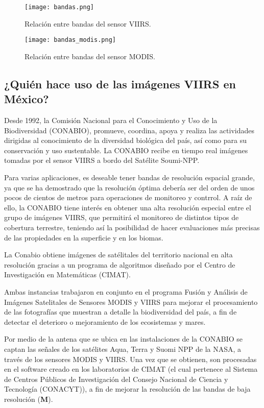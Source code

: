 \begin{figure}[ht!]
\centering
\texttt{[image: bandas.png]}
\caption{Relación entre bandas del sensor VIIRS.} \label{bandas_viirs}
\end{figure}

\begin{figure}[ht!]

\centering
\texttt{[image: bandas\_modis.png]}
\caption{Relación entre bandas del sensor MODIS.} \label{bandas_modis}
\end{figure}

\subsection{¿Quién hace uso de las imágenes VIIRS en México?}

Desde 1992, la Comisión Nacional para el Conocimiento y Uso de la Biodiversidad (CONABIO), promueve, coordina, apoya y realiza las actividades dirigidas al conocimiento de la diversidad biológica del país, así como para su conservación y uso sustentable. La CONABIO recibe en tiempo real imágenes tomadas por el sensor VIIRS a bordo del Satélite Soumi-NPP. 

Para varias aplicaciones, es deseable tener bandas de resolución espacial grande, ya que se ha demostrado que la resolución óptima debería ser del orden de unos pocos de cientos de metros para operaciones de monitoreo y contrrol. A raíz de ello, la CONABIO tiene interés en obtener una alta resolución especial entre el grupo de imágenes VIIRS, que permitirá el monitoreo de distintos tipos de cobertura terrestre, teniendo así la posibilidad de hacer evaluaciones más precisas de las propiedades en la superficie y en los biomas. 

La Conabio obtiene imágenes de satélitales del territorio nacional en alta resolución gracias a un programa de algoritmos diseñado por el Centro de Investigación en Matemáticas (CIMAT).

Ambas instancias trabajaron en conjunto en el programa Fusión y Análisis de Imágenes Satelitales de Sensores MODIS y VIIRS para mejorar el procesamiento de las fotografías que muestran a detalle la biodiversidad del país, a fin de detectar el deterioro o mejoramiento de los ecosistemas y mares. 

Por medio de la antena que se ubica en las instalaciones de la CONABIO se captan las señales de los satélites Aqua, Terra y Suomi NPP de la NASA, a través de los sensores MODIS y VIIRS. Una vez que se obtienen, son procesadas en el software creado en los laboratorios de CIMAT (el cual pertenece al Sistema de Centros Públicos de Investigación del Consejo Nacional de Ciencia y Tecnología (CONACYT)), a fin de mejorar la resolución de las bandas de baja resolución (\textbf{M}).

